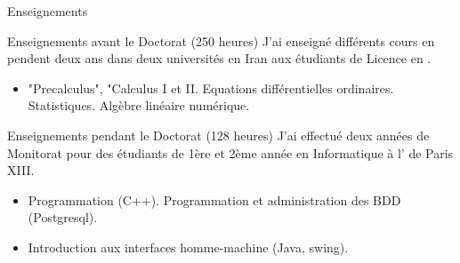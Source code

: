 \begin{frame}{Enseignements}
\begin{block}{Enseignements avant le Doctorat (250 heures)}
J’ai enseigné différents cours en  pendent deux ans dans deux universités en Iran aux étudiants
de Licence en .
\begin{itemize}
\item "Precalculus", "Calculus I et II. Equations différentielles ordinaires. Statistiques. Algèbre linéaire numérique.
\end{itemize}
\end{block}
%
\begin{block}{Enseignements pendant le Doctorat (128 heures)}
J’ai effectué deux années de Monitorat pour des étudiants de 1ère
et 2ème année en Informatique à l’  de Paris XIII.
\begin{itemize}
\item Programmation (C++). Programmation et administration des BDD (Postgresql). 
\item Introduction aux interfaces homme-machine (Java, swing).
\end{itemize}
\end{block}
%
\end{frame}



